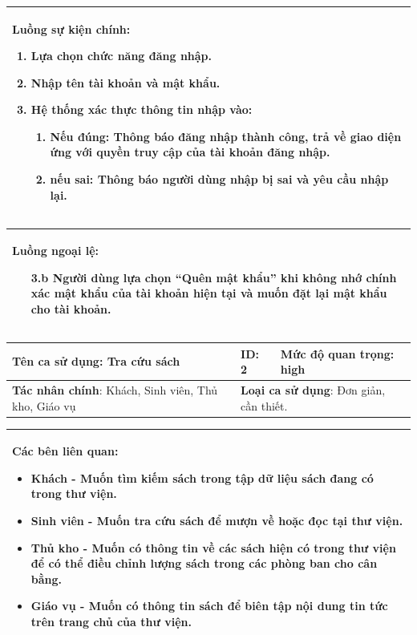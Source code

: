 \documentclass[12pt]{report}
\begin{document}
\begin{center}
\begin{tabular}{| m{15.9cm} |}
    \hline
    \textbf{Luồng sự kiện chính}:
    \begin{enumerate}
        \item Lựa chọn chức năng đăng nhập. 
        \item Nhập tên tài khoản và mật khẩu. 
        \item Hệ thống xác thực thông tin nhập vào: 
        \begin{enumerate}
            \item Nếu đúng: Thông báo đăng nhập thành công, trả về giao diện ứng với quyền truy cập của tài khoản đăng nhập. 
            \item nếu sai: Thông báo người dùng nhập bị sai và yêu cầu nhập lại. 
        \end{enumerate}
    \end{enumerate} \\
    \hline
\end{tabular}

\begin{tabular}{| m{15.9cm} |}
    \hline
    \textbf{Luồng ngoại lệ}:
    \begin{enumerate}
        \item[3.b] Người dùng lựa chọn ``Quên mật khẩu'' khi không nhớ chính xác mật khẩu của tài khoản hiện tại và muốn đặt lại mật khẩu cho tài khoản. 
    \end{enumerate} \\
    \hline
\end{tabular}

\newpage
\begin{tabular}{| m{6cm} | m{3cm} | m{6cm} |}
    \hline
    \textbf{Tên ca sử dụng}: Tra cứu sách & \textbf{ID}: 2 & \textbf{Mức độ quan trọng}: high \\
    \hline
    \textbf{Tác nhân chính}: Khách, Sinh viên, Thủ kho, Giáo vụ & \multicolumn{2}{|l|}{\textbf{Loại ca sử dụng}: Đơn giản, cần thiết.} \\
    \hline
\end{tabular}
\begin{tabular}{| m{15.9cm} |}
    \hline
        \textbf{Các bên liên quan:} 
        \begin{itemize}
            \item Khách - Muốn tìm kiếm sách trong tập dữ liệu sách đang có trong thư viện. 
            \item Sinh viên - Muốn tra cứu sách để mượn về hoặc đọc tại thư viện. 
            \item Thủ kho - Muốn có thông tin về các sách hiện có trong thư viện để có thể điều chỉnh lượng sách trong các phòng ban cho cân bằng. 
            \item Giáo vụ - Muốn có thông tin sách để biên tập nội dung tin tức trên trang chủ của thư viện. 
        \end{itemize} \\
    \hline
\end{tabular}


\end{center}
\end{document}
